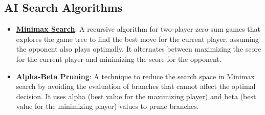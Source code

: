 \documentclass{article}%
\begin{document}
\subsection{AI Search Algorithms}%
\label{subsec:AISearchAlgorithms}%
\begin{itemize}[leftmargin=*]%
\item \href{\url{https://purdue.brightspace.com/d2l/common/assets/pdfjs-d2l-dist/1.0.14-legacy/web/viewer.html?file=\%252Fcontent\%252Fenforced\%252F1095467-wl.202510.CS.24300.001\%252F02L2-Intro.pdf\%253Fou\%253D1095467\&lang=en-us\&container=d2l-fileviewer-rendered-pdf\&fullscreen=d2l-fileviewer-rendered-pdf-dialog\&height=667}#page=22}{\textbf{Minimax Search}}: A recursive algorithm for two-player zero-sum games that explores the game tree to find the best move for the current player, assuming the opponent also plays optimally. It alternates between maximizing the score for the current player and minimizing the score for the opponent.%
\item \href{\url{https://purdue.brightspace.com/d2l/common/assets/pdfjs-d2l-dist/1.0.14-legacy/web/viewer.html?file=\%252Fcontent\%252Fenforced\%252F1095467-wl.202510.CS.24300.001\%252F02L2-Intro.pdf\%253Fou\%253D1095467\&lang=en-us\&container=d2l-fileviewer-rendered-pdf\&fullscreen=d2l-fileviewer-rendered-pdf-dialog\&height=667}#page=23}{\textbf{Alpha-Beta Pruning}}: A technique to reduce the search space in Minimax search by avoiding the evaluation of branches that cannot affect the optimal decision. It uses alpha (best value for the maximizing player) and beta (best value for the minimizing player) values to prune branches.%
\end{itemize}

%
\end{document}
